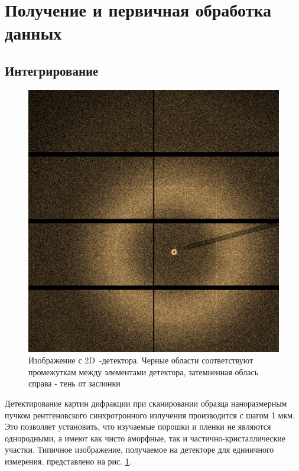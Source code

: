 	\section{Получение и первичная обработка данных}

\subsection{Интегрирование}	
	
			\begin{figure}
\singlespacing
\vspace{-35px}
    \includegraphics[width=0.9\linewidth]{fig/obj.png}
    \vspace{3px}
    \caption{Изображение с 2D~-детектора. Черные области соответствуют промежуткам между элементами детектора, затемненная облась справа  - тень от заслонки}
    \label{fig:difractogram}
\end{figure}
	
	
	Детектирование картин дифракции при сканировании образца наноразмерным пучком рентгеновского синхротронного излучения производится с шагом 1 мкм. 
	Это позволяет установить, что изучаемые порошки и пленки не являются однородными, а имеют как чисто аморфные, так и частично-кристаллические участки.
	Типичное изображение, получаемое на детекторе для единичного измерения, представлено на рис. \ref{fig:difractogram}. 
	
